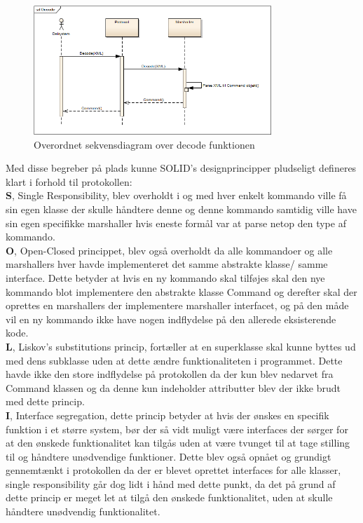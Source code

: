 \begin{figure}[H]
	\centering
	\includegraphics[width=0.8\textwidth]{Projektbeskrivelse/SharedLib/Images/Rapport/Decode.png}
	\caption{Overordnet sekvensdiagram over decode funktionen}
	\label{fig:DecodeSL}
\end{figure}


Med disse begreber på plads kunne SOLID's designprincipper pludseligt defineres klart i forhold til protokollen:\\

\textbf{S}, Single Responsibility, blev overholdt i og med hver enkelt kommando ville få sin egen klasse der skulle håndtere denne og denne kommando samtidig ville have sin egen specifikke marshaller hvis eneste formål var at parse netop den type af kommando.\\

\textbf{O}, Open-Closed princippet, blev også overholdt da alle kommandoer og alle marshallers hver havde implementeret det samme abstrakte klasse/ samme interface. Dette betyder at hvis en ny kommando skal tilføjes skal den nye kommando blot implementere den abstrakte klasse Command og derefter skal der oprettes en marshallers der implementere marshaller interfacet, og på den måde vil en ny kommando ikke have nogen indflydelse på den allerede eksisterende kode.\\

\textbf{L}, Liskov's substitutions princip, fortæller at en superklasse skal kunne byttes ud med dens subklasse uden at dette ændre funktionaliteten i programmet. Dette havde ikke den store indflydelse på protokollen da der kun blev nedarvet fra Command klassen og da denne kun indeholder attributter blev der ikke brudt med dette princip.\\

\textbf{I}, Interface segregation, dette princip betyder at hvis der ønskes en specifik funktion i et større system, bør der så vidt muligt være interfaces der sørger for at den ønskede funktionalitet kan tilgås uden at være tvunget til at tage stilling til og håndtere unødvendige funktioner. Dette blev også opnået og grundigt gennemtænkt i protokollen da der er blevet oprettet interfaces for alle klasser, single responsibility går dog lidt i hånd med dette punkt, da det på grund af dette princip er meget let at tilgå den ønskede funktionalitet, uden at skulle håndtere unødvendig funktionalitet.\\

